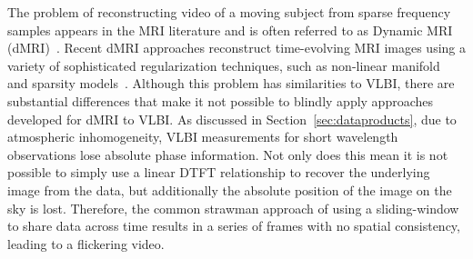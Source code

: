 The problem of reconstructing video of a moving subject from sparse frequency samples appears in the MRI literature and is often referred to as Dynamic MRI (dMRI)~\cite{tsao2012mri, liang1994efficient, fessler, chun2012spatial}. Recent dMRI approaches reconstruct time-evolving MRI images using a variety of sophisticated regularization techniques, such as non-linear manifold~\cite{nakarmi2017kernel} and sparsity models~\cite{chen2008prior, biswas}. Although this problem has similarities to VLBI, there are substantial differences that make it not possible to blindly apply approaches developed for dMRI to VLBI. As discussed in Section~\ref{sec:dataproducts}, due to atmospheric inhomogeneity, VLBI measurements for short wavelength observations lose absolute phase information. Not only does this mean it is not possible to simply use a linear DTFT relationship to recover the underlying image from the data, but additionally the absolute position of the image on the sky is lost. Therefore, the common strawman approach of using a sliding-window to share data across time results in a series of frames with no spatial consistency, leading to a flickering video. 






